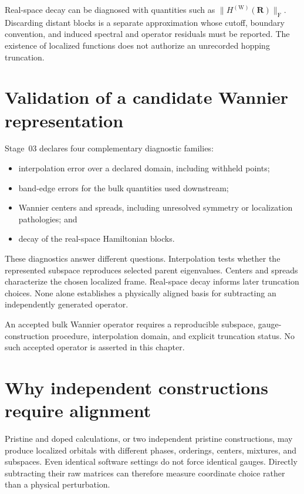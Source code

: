 Real-space decay can be diagnosed with quantities such as
$\|H^{(\mathrm W)}(\mathbf R)\|_{\mathrm F}$. Discarding distant blocks is a
separate approximation whose cutoff, boundary convention, and induced spectral
and operator residuals must be reported. The existence of localized functions
does not authorize an unrecorded hopping truncation.

\section{Validation of a candidate Wannier representation}

Stage~03 declares four complementary diagnostic families:

\begin{itemize}
  \item interpolation error over a declared domain, including withheld points;
  \item band-edge errors for the bulk quantities used downstream;
  \item Wannier centers and spreads, including unresolved symmetry or
    localization pathologies; and
  \item decay of the real-space Hamiltonian blocks.
\end{itemize}

These diagnostics answer different questions. Interpolation tests whether the
represented subspace reproduces selected parent eigenvalues. Centers and spreads
characterize the chosen localized frame. Real-space decay informs later
truncation choices. None alone establishes a physically aligned basis for
subtracting an independently generated operator.

An accepted bulk Wannier operator requires a reproducible subspace,
gauge-construction procedure, interpolation domain, and explicit truncation
status. No such accepted operator is asserted in this chapter.

\section{Why independent constructions require alignment}

Pristine and doped calculations, or two independent pristine constructions, may
produce localized orbitals with different phases, orderings, centers, mixtures,
and subspaces. Even identical software settings do not force identical gauges.
Directly subtracting their raw matrices can therefore measure coordinate choice
rather than a physical perturbation.

